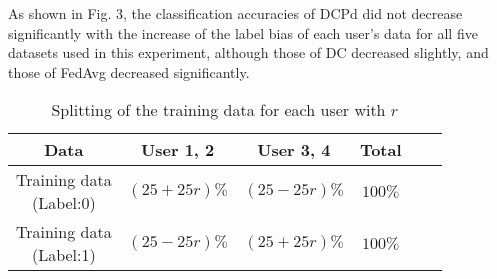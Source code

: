 \documentclass{article}
\begin{document}
As shown in Fig. 3, the classification accuracies of DCPd did not decrease significantly with the increase of the label bias of each user's data for all five datasets used in this experiment, although those of DC decreased slightly, and those of FedAvg decreased significantly.

\begin{table}[htbp]
\caption{Splitting of the training data for each user with $r$}
\centering
  \label{tab:Table 9}
  \begin{tabular}{cccccc}
    \hline
Data & User 1, 2 & User 3, 4 & Total \\ 
    \hline
\makecell{Training data \\ (Label:0)} & $(25+25r)\%$ & $(25-25r)\%$ & $100\%$ \\ 
\makecell{Training data \\ (Label:1)} & $(25-25r)\%$ & $(25+25r)\%$ & $100\%$ \\
    \hline
    \end{tabular}
\end{table}
\end{document}
